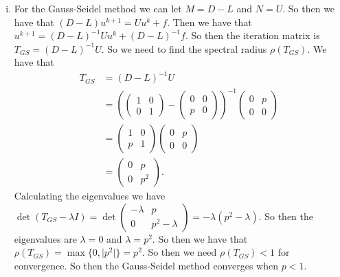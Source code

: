 \documentclass{article}
\begin{document}
\begin{enumerate}[(a)]
\begin{enumerate}[i.)]
        \newpage
        \item For the Gauss-Seidel method we can let $M = D - L$ and $N = U$. So then we have that $(D - L)u^{k+1} = Uu^k + f$. Then we have that $u^{k+1} = (D - L)^{-1}Uu^k + (D - L)^{-1}f$. So then the iteration matrix is $T_{GS} = (D - L)^{-1}U$. So we need to find the spectral radius $\rho(T_{GS})$. We have that
        \begin{align*}
            T_{GS} &= (D - L)^{-1}U \\
            &= \left( \begin{pmatrix}
                1 & 0 \\
                0 & 1
            \end{pmatrix} - \begin{pmatrix}
                0 & 0 \\
                p & 0
            \end{pmatrix} \right)^{-1} \begin{pmatrix}
                0 & p \\
                0 & 0
            \end{pmatrix} \\
            &= \begin{pmatrix}
                1 & 0 \\
                p & 1
            \end{pmatrix} \begin{pmatrix}
                0 & p \\
                0 & 0
            \end{pmatrix} \\
            &= \begin{pmatrix}
                0 & p \\
                0 & p^2
            \end{pmatrix}.
        \end{align*}
        Calculating the eigenvalues we have $\det(T_{GS} - \lambda I) = \det \begin{pmatrix}
            -\lambda & p \\
            0 & p^2 - \lambda
        \end{pmatrix} = -\lambda(p^2 - \lambda)$. So then the eigenvalues are $\lambda = 0$ and $\lambda = p^2$. So then we have that $\rho(T_{GS}) = \max\{0, \vert p^2 \vert\} = p^2$. So then we need $\rho(T_{GS}) < 1$ for convergence. So then the Gauss-Seidel method converges when $p < 1$.
    \end{enumerate}

\end{enumerate}
\end{document}

